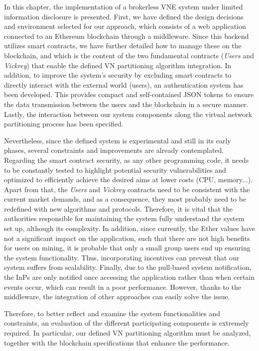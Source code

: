 In this chapter, the implementation of a brokerless VNE system under limited information disclosure is presented. First, we have defined the design decisions and environment selected for our approach, which consists of a web application connected to an Ethereum blockchain through a middleware. Since this backend utilizes smart contracts, we have further detailed how to manage these on the blockchain, and which is the content of the two fundamental contracts (\textit{Users} and \textit{Vickrey}) that enable the defined VN partitioning algorithm integration. In addition, to improve the system's security by excluding smart contracts to directly interact with the external world (users), an authentication system has been developed. This provides compact and self-contained JSON tokens to ensure the data transmission between the users and the blockchain in a secure manner. Lastly, the interaction between our system components along the virtual network partitioning process has been specified.

Nevertheless, since the defined system is experimental and still in its early phases, several constraints and improvements are already contemplated. Regarding the smart contract security, as any other programming code, it needs to be constantly tested to highlight potential security vulnerabilities and optimized to efficiently achieve the desired aims at lower costs (CPU, memory...). Apart from that, the \textit{Users} and \textit{Vickrey} contracts need to be consistent with the current market demands, and as a consequence, they most probably need to be redefined with new algorithms and protocols. Therefore, it is vital that the authorities responsible for maintaining the system fully understand the system set up, although its complexity. In addition, since currently, the Ether values have not a significant impact on the application, such that there are not high benefits for users on mining, it is probable that only a small group users end up ensuring the system functionality. Thus, incorporating incentives can prevent that our system suffers from scalability. Finally, due to the pull-based system notification, the InPs are only notified once accessing the application rather than when certain events occur, which can result in a poor performance. However, thanks to the middleware, the integration of other approaches can easily solve the issue.

Therefore, to better reflect and examine the system functionalities and constraints, an evaluation of the different participating components is extremely required. In particular, our defined VN partitioning algorithm must be analyzed, together with the blockchain specifications that enhance the performance.


